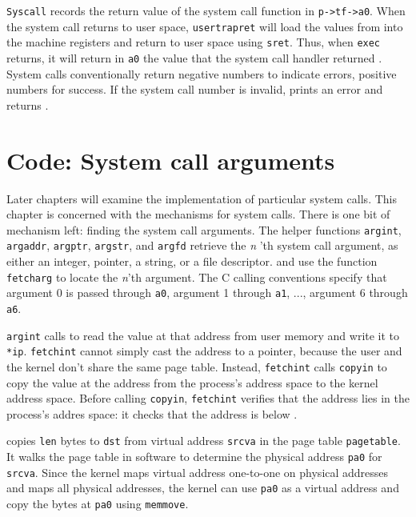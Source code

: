 \lstinline{Syscall}
records the return value of the system call function in
\lstinline{p->tf->a0}.
When the system call returns to user space,
\lstinline{usertrapret}
will load the values
from
into the machine registers
and return to user space
using
\lstinline{sret}.
Thus, when 
\lstinline{exec}
returns, it will return in \lstinline{a0} the value
that the system call handler returned
.
System calls conventionally return negative numbers to indicate
errors, positive numbers for success.
If the system call number is invalid,
prints an error and returns .

\section{Code: System call arguments}

Later chapters will examine the implementation of
particular system calls.
This chapter is concerned with the mechanisms for system calls.
There is one bit of mechanism left: finding the system call arguments.
The helper functions
\lstinline{argint},
\lstinline{argaddr},
\lstinline{argptr},
\lstinline{argstr},
and
\lstinline{argfd}
retrieve the 
\textit{n} 'th 
system call
argument, as either an integer, pointer, a string, or a file descriptor.
and
use the function
\lstinline{fetcharg}
to locate the
\textit{n}'th 
argument. The C calling conventions specify that argument 0 is passed
through
\texttt{a0},
argument 1 through
\texttt{a1}, ...,
argument 6 through
\texttt{a6}.

\lstinline{argint} calls  to read the value at
that address from user memory and write it to \lstinline{*ip}.
\lstinline{fetchint} cannot simply cast the address to a pointer,
because the user and the kernel don't share the same page
table. Instead, \lstinline{fetchint} calls \lstinline{copyin} to copy
the value at the address from the process's address space to the
kernel address space.  Before calling \lstinline{copyin},
\lstinline{fetchint} verifies that the address lies in the process's
addres space: it checks that the address is below .

 copies \lstinline{len} bytes to
\lstinline{dst} from virtual address \lstinline{srcva} in the page
table \lstinline{pagetable}.  It walks the page table in software to
determine the physical address \lstinline{pa0} for \lstinline{srcva}.
Since the kernel maps virtual address one-to-one on physical
addresses and maps all physical addresses, the kernel can use
\lstinline{pa0} as a virtual address and copy the bytes at
\lstinline{pa0} using \lstinline{memmove}.

